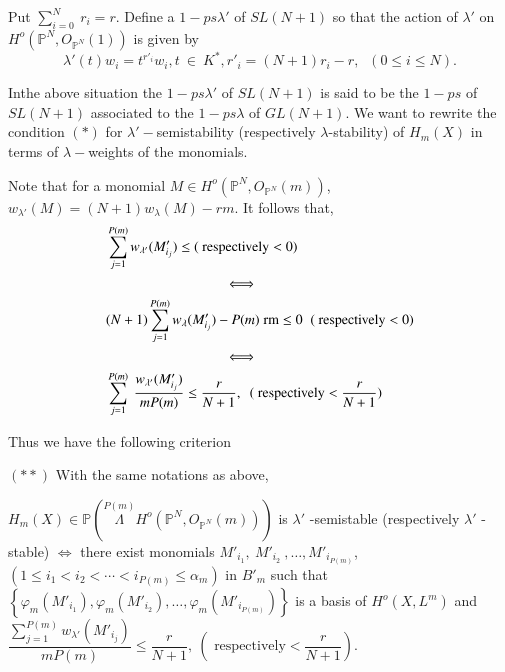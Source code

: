 {\noindent
Put $\sum\limits_{i=0}^{N}~r_i = r$. Define a $1-ps\lambda'$ of
$SL(N+1)$ so that the action of $\lambda'$ on
$H^o (\mathbb{P}^N,O_{\mathbb{P}^N}(1))$ is given by  
$$
\lambda'(t)w_i = t^{r'_i}w_i ,t~\in~K^*,r'_i = (N+1)r_i - r,\;\;(0
\le i \le N). 
$$

\begin{subdefin}\label{chap0:subdef0.1.2} %
In\pageoriginale the above situation the $1 - ps \lambda'$ of $SL
(N+1)$ is said to 
be the $1-ps$ of $SL (N+1)$ associated to the  $1 - ps \lambda$  of
$GL (N+1)$. We want to rewrite the condition $(*)$ for $\lambda'
-$semistability (respectively $\lambda$-stability) of $H_m (X)$ in
terms  of $\lambda-$weights of the monomials.  
\end{subdefin}

Note that for a monomial $M \in H^o (\mathbb{P}^N,
O_{\mathbb{P}^{N}} (m))$, $w_{\lambda'} (M) = (N+1) w_{\lambda} (M)
-rm$. It follows that,   
\begin{align*}
& \sum\limits^{P(m)}_{j=1} w_{\lambda'} (M'_{i_{j}}) \leq (\text{
  respectively} < 0) \\
& \hspace{3cm}\Longleftrightarrow \\
& (N+1) \sum^{P(m)}_{j=1} w_{\lambda} (M'_{i_{j}}) -
P(m) \; {\rm rm} \leq 0 \;\; (\text{ respectively} < 0 ) \\
& \hspace{3cm}\Longleftrightarrow \\
& \sum^{P(m)}_{j=1}  ~ \frac{ w_{\lambda'} (M'_{i_{j}})}{mP (m)} \leq
\frac{r}{N+1}, ~~ (\text{ respectively} <  \frac{r}{N+1} )
\end{align*}

\noindent
Thus we have the following criterion

\medskip
$(**)$ With the same notations as above,\label{page10}

$ H_m (X) \in \mathbb{P} (\overset{P (m)}{\Lambda} H^o  (
\mathbb{P}^{N}, O_{\mathbb{P}^{N}} (m))) $  is $ \lambda' $
-semistable (respectively $\lambda'$ -stable) $ \Leftrightarrow$
  there exist monomials $M'_{i_{1}}, ~ M'_{i_{2}}  ~ ,\ldots ,
  M'_{i_{P (m)}}$,  
$ (1 \le i_1 < i_2 < \cdots < i_{P (m)} \le \alpha_m )$ in $B'_m$ such that
$ \left\{ \varphi_m  (M'_{i_{1}}),  \varphi_m  (M'_{i_{2}}),\ldots,
  \varphi_m  (M'_{i_{P(m)}})  \right\}$ is a basis of $H^o (X,L^m)$ and 
$\dfrac{\sum\limits^{P(m)}_{j=1} w_{\lambda'} (M'_{i_{j}})}{mP (m)}
  \leq \dfrac{r}{N+1} ,  ~  (\text{ respectively} <  \dfrac{r}{N+1})$. 


}
